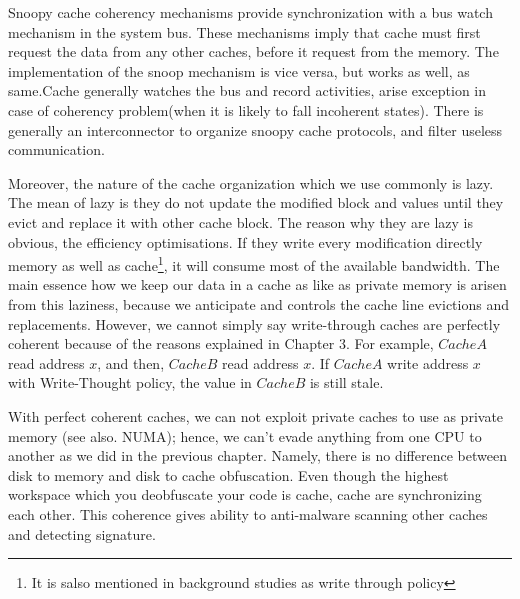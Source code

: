 Snoopy cache coherency mechanisms provide synchronization with a bus watch mechanism in the system bus. These mechanisms imply that cache must first request the data from any other caches, before it request from the memory. The implementation of the snoop mechanism is vice versa, but works as well, as same.Cache generally watches the bus and record activities, arise exception in case of coherency problem(when it is likely to fall incoherent states).\cite{Jim2007} There is generally an interconnector to organize snoopy cache protocols, and filter useless communication. 

Moreover, the nature of the cache organization which we use commonly is lazy. The mean of lazy is they do not update the modified block and values until they evict and replace it with other cache block. The reason why they are lazy is obvious, the efficiency optimisations. If they write every modification directly memory as well as cache\footnote{It is salso  mentioned in background studies as write through policy}, it will consume most of the available bandwidth. The main essence how we keep our data in a cache as like as private memory is arisen from this laziness, because we anticipate and controls the cache line evictions and replacements. However, we cannot simply say write-through caches are perfectly coherent because of the reasons explained in Chapter 3. For example, $CacheA$ read address $x$, and then, $CacheB$ read address $x$. If $CacheA$ write address $x$ with Write-Thought policy, the value in $CacheB$ is still stale.

With perfect coherent caches, we can not exploit private caches to use as private memory (see also. NUMA); hence, we can't evade anything from one CPU to another as we did in the previous chapter. Namely, there is no difference between disk to memory and disk to cache obfuscation. Even though the highest workspace which you deobfuscate your code is cache, cache are synchronizing each other. This coherence gives ability to anti-malware scanning other caches and detecting signature.
